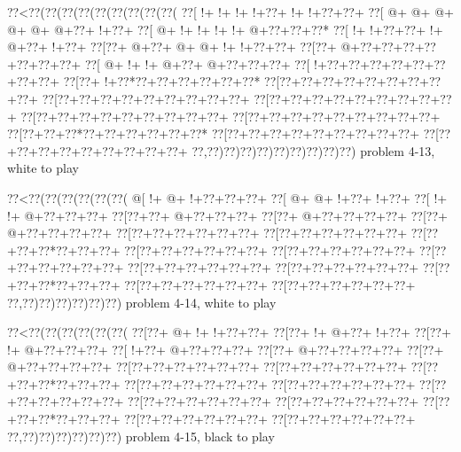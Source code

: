 \vbox{\vbox{\goo
\0??<\0??(\0??(\0??(\0??(\0??(\0??(\0??(\0??(\0??(
\0??[\- !+\- !+\- !+\- !+\0??+\- !+\- !+\0??+\0??+
\0??[\- @+\- @+\- @+\- @+\- @+\- @+\0??+\- !+\0??+
\0??[\- @+\- !+\- !+\- !+\- !+\- @+\0??+\0??+\0??*
\0??[\- !+\- !+\0??+\0??+\- !+\- @+\0??+\- !+\0??+
\0??[\0??+\- @+\0??+\- @+\- @+\- !+\- !+\0??+\0??+
\0??[\0??+\- @+\0??+\0??+\0??+\0??+\0??+\0??+\0??+
\0??[\- @+\- !+\- !+\- @+\0??+\- @+\0??+\0??+\0??+
\0??[\- !+\0??+\0??+\0??+\0??+\0??+\0??+\0??+\0??+
\0??[\0??+\- !+\0??*\0??+\0??+\0??+\0??+\0??+\0??*
\0??[\0??+\0??+\0??+\0??+\0??+\0??+\0??+\0??+\0??+
\0??[\0??+\0??+\0??+\0??+\0??+\0??+\0??+\0??+\0??+
\0??[\0??+\0??+\0??+\0??+\0??+\0??+\0??+\0??+\0??+
\0??[\0??+\0??+\0??+\0??+\0??+\0??+\0??+\0??+\0??+
\0??[\0??+\0??+\0??+\0??+\0??+\0??+\0??+\0??+\0??+
\0??[\0??+\0??+\0??*\0??+\0??+\0??+\0??+\0??+\0??*
\0??[\0??+\0??+\0??+\0??+\0??+\0??+\0??+\0??+\0??+
\0??[\0??+\0??+\0??+\0??+\0??+\0??+\0??+\0??+\0??+
\0??,\0??)\0??)\0??)\0??)\0??)\0??)\0??)\0??)\0??)
}
\hfil problem 4-13, white to play\hfil\break
}

\vbox{\vbox{\goo
\0??<\0??(\0??(\0??(\0??(\0??(\0??(
\- @[\- !+\- @+\- !+\0??+\0??+\0??+
\0??[\- @+\- @+\- !+\0??+\- !+\0??+
\0??[\- !+\- !+\- @+\0??+\0??+\0??+
\0??[\0??+\0??+\- @+\0??+\0??+\0??+
\0??[\0??+\- @+\0??+\0??+\0??+\0??+
\0??[\0??+\- @+\0??+\0??+\0??+\0??+
\0??[\0??+\0??+\0??+\0??+\0??+\0??+
\0??[\0??+\0??+\0??+\0??+\0??+\0??+
\0??[\0??+\0??+\0??*\0??+\0??+\0??+
\0??[\0??+\0??+\0??+\0??+\0??+\0??+
\0??[\0??+\0??+\0??+\0??+\0??+\0??+
\0??[\0??+\0??+\0??+\0??+\0??+\0??+
\0??[\0??+\0??+\0??+\0??+\0??+\0??+
\0??[\0??+\0??+\0??+\0??+\0??+\0??+
\0??[\0??+\0??+\0??*\0??+\0??+\0??+
\0??[\0??+\0??+\0??+\0??+\0??+\0??+
\0??[\0??+\0??+\0??+\0??+\0??+\0??+
\0??,\0??)\0??)\0??)\0??)\0??)\0??)
}
\hfil problem 4-14, white to play\hfil\break
}

\vbox{\vbox{\goo
\0??<\0??(\0??(\0??(\0??(\0??(\0??(
\0??[\0??+\- @+\- !+\- !+\0??+\0??+
\0??[\0??+\- !+\- @+\0??+\- !+\0??+
\0??[\0??+\- !+\- @+\0??+\0??+\0??+
\0??[\- !+\0??+\- @+\0??+\0??+\0??+
\0??[\0??+\- @+\0??+\0??+\0??+\0??+
\0??[\0??+\- @+\0??+\0??+\0??+\0??+
\0??[\0??+\0??+\0??+\0??+\0??+\0??+
\0??[\0??+\0??+\0??+\0??+\0??+\0??+
\0??[\0??+\0??+\0??*\0??+\0??+\0??+
\0??[\0??+\0??+\0??+\0??+\0??+\0??+
\0??[\0??+\0??+\0??+\0??+\0??+\0??+
\0??[\0??+\0??+\0??+\0??+\0??+\0??+
\0??[\0??+\0??+\0??+\0??+\0??+\0??+
\0??[\0??+\0??+\0??+\0??+\0??+\0??+
\0??[\0??+\0??+\0??*\0??+\0??+\0??+
\0??[\0??+\0??+\0??+\0??+\0??+\0??+
\0??[\0??+\0??+\0??+\0??+\0??+\0??+
\0??,\0??)\0??)\0??)\0??)\0??)\0??)
}
\hfil problem 4-15, black to play\hfil\break
}

